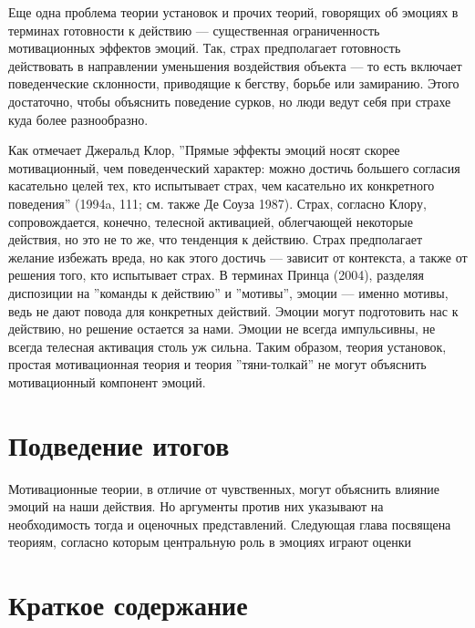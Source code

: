 \documentclass[11pt]{book}
\begin{document}
Еще одна проблема теории установок и прочих теорий, говорящих об эмоциях в терминах готовности к действию --- существенная ограниченность мотивационных эффектов эмоций. Так, страх предполагает готовность действовать в направлении уменьшения воздействия объекта --- то есть включает поведенческие склонности, приводящие к бегству, борьбе или замиранию. Этого достаточно, чтобы объяснить поведение сурков, но люди ведут себя при страхе куда более разнообразно.

Как отмечает Джеральд Клор, ''Прямые эффекты эмоций носят скорее мотивационный, чем поведенческий характер: можно достичь большего согласия касательно целей тех, кто испытывает страх, чем касательно их конкретного поведения'' (1994a, 111; см. также Де Соуза 1987). Страх, согласно Клору, сопровождается, конечно, телесной активацией, облегчающей некоторые действия, но это не то же, что тенденция к действию. Страх предполагает желание избежать вреда, но как этого достичь --- зависит от контекста, а также от решения того, кто испытывает страх. В терминах Принца (2004), разделяя диспозиции на ''команды к действию'' и ''мотивы'', эмоции --- именно мотивы, ведь не дают повода для конкретных действий. Эмоции могут подготовить нас к действию, но решение остается за нами. Эмоции не всегда импульсивны, не всегда телесная активация столь уж сильна. Таким образом, теория установок, простая мотивационная теория и теория ''тяни-толкай'' не могут объяснить мотивационный компонент эмоций.

\section{Подведение итогов}

Мотивационные теории, в отличие от чувственных, могут объяснить влияние эмоций на наши действия. Но аргументы против них указывают на необходимость тогда и оценочных представлений. Следующая глава посвящена теориям, согласно которым центральную роль в эмоциях играют оценки

\section{Краткое содержание}
\end{document}
